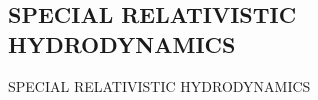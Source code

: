 \begin{partoneen}
\chapter{SPECIAL RELATIVISTIC HYDRODYNAMICS}
{\huge SPECIAL RELATIVISTIC HYDRODYNAMICS}
\end{partoneen}
